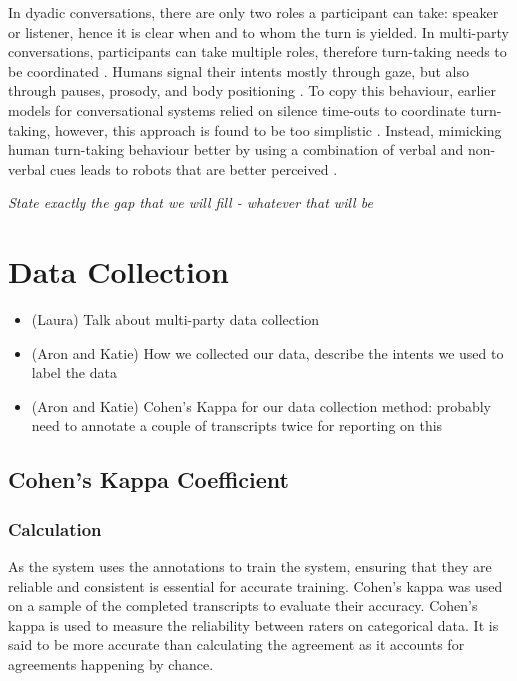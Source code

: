 \documentclass[hidelinks, 11pt]{article}
\begin{document}
In dyadic conversations, there are only two roles a participant can take: speaker or listener, hence it is clear when and to whom the turn is yielded. In multi-party conversations, participants can take multiple roles, therefore turn-taking needs to be coordinated \cite{Johansson_Skantze_2015}. Humans signal their intents mostly through gaze, but also through pauses, prosody, and body positioning \cite{Żarkowski_2019}. To copy this behaviour, earlier models for conversational systems relied on silence time-outs to coordinate turn-taking, however, this approach is found to be too simplistic \cite{skantze_turn_taking_2021}. Instead, mimicking human turn-taking behaviour better by using a combination of verbal and non-verbal cues leads to robots that are better perceived \cite{moujahid_multi_party_2022}.

\textit{State exactly the gap that we will fill - whatever that will be}


\section{Data Collection}
\label{sec:data_collection}

\begin{itemize}
  \item (Laura) Talk about multi-party data collection
  \item (Aron and Katie) How we collected our data, describe the intents we used to label the data
  \item (Aron and Katie) Cohen's Kappa for our data collection method: probably need to annotate a couple of transcripts twice for reporting on this
\end{itemize}
\subsection{Cohen's Kappa Coefficient}
\subsubsection{Calculation}
As the system uses the annotations to train the system, ensuring that they are reliable and consistent is essential for accurate training. Cohen's kappa was used on a sample of the completed transcripts to evaluate their accuracy. Cohen's kappa is used to measure the reliability between raters on categorical data. It is said to be more accurate than calculating the agreement as it accounts for agreements happening by chance.
\end{document}
